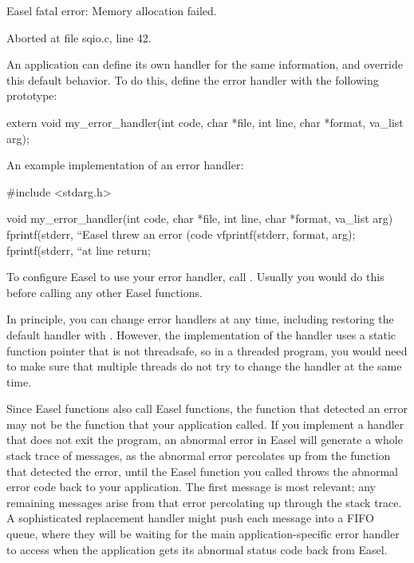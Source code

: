 \begin{cchunk}
Easel fatal error:
Memory allocation failed.

Aborted at file sqio.c, line 42. 
\end{cchunk}

An application can define its own handler for the same information,
and override this default behavior. To do this, define the error
handler with the following prototype:

\begin{cchunk}
extern void my_error_handler(int code, char *file, int line, char *format, va_list arg);
\end{cchunk}

An example implementation of an error handler:

\begin{cchunk}
#include <stdarg.h>

void
my_error_handler(int code, char *file, int line, char *format, va_list arg)
{
  fprintf(stderr, ``Easel threw an error (code %
  vfprintf(stderr, format, arg);
  fprintf(stderr, ``at line %
  return;
}
\end{cchunk}

To configure Easel to use your error handler, call
. Usually you
would do this before calling any other Easel functions.

In principle, you can change error handlers at any time, including
restoring the default handler with
. However, the
implementation of the handler uses a static function pointer that is
not threadsafe, so in a threaded program, you would need to make sure
that multiple threads do not try to change the handler at the same
time.

Since Easel functions also call Easel functions, the function that
detected an error may not be the function that your application
called.  If you implement a handler that does not exit the program, an
abnormal error in Easel will generate a whole stack trace of
 messages, as the abnormal error percolates up from
the function that detected the error, until the Easel function you
called throws the abnormal error code back to your application. The
first  message is most relevant; any remaining
messages arise from that error percolating up through the stack trace.
A sophisticated replacement  handler might push each
 message into a FIFO queue, where they will be
waiting for the main application-specific error handler to access when
the application gets its abnormal status code back from Easel.

